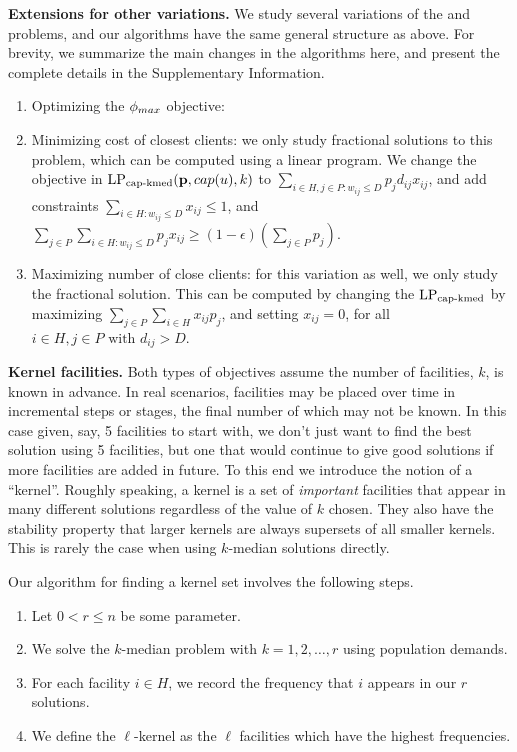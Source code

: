 \begin{theorem}
\label{theorem:kmedstatic}
\end{theorem}

\noindent
\textbf{Extensions for other variations.}
We study several variations of the \probstatic{} and \probinc{} problems, and our algorithms have the same
general structure as \algokmedstatic{} above. For brevity, we summarize the main changes in the algorithms here,
and present the complete details in the Supplementary Information.
\begin{enumerate}
\item
Optimizing the $\phi_{max}$ objective: 
\item
Minimizing cost of closest clients: 
we only study fractional solutions to this problem, which can be computed using a linear program.
We change the objective in $\text{LP}_{\text{cap-kmed}}(\mathbf{p}, cap(u), k)$
to $\sum_{i \in H, j \in P: w_{ij} \leq D} p_j d_{ij} x_{ij}$,
and add constraints $\sum_{i \in H: w_{ij} \leq D} x_{ij} \leq 1$, and
$\sum_{j \in P} \sum_{i \in H: w_{ij} \leq D} p_j x_{ij} \geq  (1-\epsilon) \left( \sum_{j \in P}p_j \right)$.
\item
Maximizing number of close clients:
for this variation as well, we only study the fractional solution. This can be computed by changing the
$\text{LP}_{\text{cap-kmed}}$ by maximizing $\sum_{j\in P}\sum_{i\in H} x_{ij}p_j$, and setting $x_{ij} = 0$,
for all $i\in H, j\in P \mbox{ with }d_{ij}>D$.
\end{enumerate}

\noindent
\textbf{Kernel facilities.}
Both types of objectives assume the number of facilities, $k$, is known in advance.
In real scenarios, facilities may be placed over time in incremental steps or stages, the final number of which may not be known. In this case given, say, 5 facilities to start with, we don't just want to find the best solution using 5 facilities, but one that would continue to give good solutions if more facilities are added in future.
To this end we introduce the notion of a ``kernel''. 
Roughly speaking, a kernel is a set of \textit{important} facilities that appear in many different solutions regardless of the value of $k$ chosen. They also have the stability property that larger kernels are always supersets of all smaller kernels. This is rarely the case when using $k$-median solutions directly.

Our algorithm \algokernelkmed{} for finding a kernel set involves the following steps.
\begin{enumerate}
\item
Let $0 < r \leq n$ be some parameter. 
\item
We solve the $k$-median problem with $k = 1, 2, \ldots, r$ using population demands. 
\item
For each facility $i \in H$, we record the frequency that $i$ appears in our $r$ solutions.
\item
We define the $\ell$-kernel as the $\ell$ facilities which have the highest frequencies. 
\end{enumerate}



